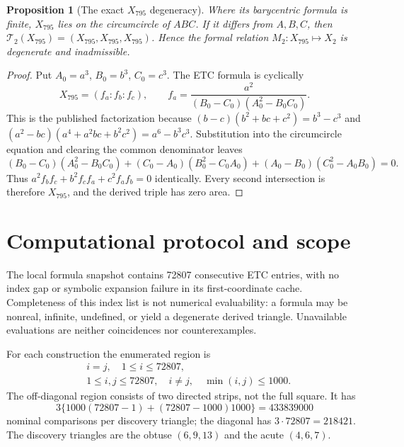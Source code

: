 \documentclass[11pt]{article}
\newtheorem{proposition}[theorem]{Proposition}
\newcommand{\Circ}{\mathcal T_2}
\begin{document}
\begin{proposition}[The exact $X_{795}$ degeneracy]\label{prop:x795}
Where its barycentric formula is finite, $X_{795}$ lies on the circumcircle
of $ABC$.  If it differs from $A,B,C$, then
$\Circ(X_{795})=(X_{795},X_{795},X_{795})$.  Hence the formal relation
$M_2:X_{795}\mapsto X_2$ is degenerate and inadmissible.
\end{proposition}
\begin{proof}
Put $A_0=a^3$, $B_0=b^3$, $C_0=c^3$.  The ETC formula is cyclically
\[
 X_{795}=(f_a:f_b:f_c),\qquad
 f_a=\frac{a^2}{(B_0-C_0)(A_0^2-B_0C_0)}.
\]
This is the published factorization because
$(b-c)(b^2+bc+c^2)=b^3-c^3$ and
$(a^2-bc)(a^4+a^2bc+b^2c^2)=a^6-b^3c^3$.
Substitution into the circumcircle equation and clearing the common
denominator leaves
\[
 (B_0-C_0)(A_0^2-B_0C_0)
 +(C_0-A_0)(B_0^2-C_0A_0)
 +(A_0-B_0)(C_0^2-A_0B_0)=0.
\]
Thus $a^2f_bf_c+b^2f_cf_a+c^2f_af_b=0$ identically.  Every second
intersection is therefore $X_{795}$, and the derived triple has zero area.
\end{proof}

\section{Computational protocol and scope}

The local formula snapshot contains 72807 consecutive ETC entries, with
no index gap or symbolic expansion failure in its first-coordinate cache.
Completeness of this index list is not numerical evaluability: a formula
may be nonreal, infinite, undefined, or yield a degenerate derived triangle.
Unavailable evaluations are neither coincidences nor counterexamples.

For each construction the enumerated region is
\begin{equation}\label{eq:scope}
 \begin{split}
 &i=j,\quad 1\leq i\leq72807,\\
 &1\leq i,j\leq72807,\quad i\ne j,\quad \min(i,j)\leq1000.
 \end{split}
\end{equation}
The off-diagonal region consists of two directed strips, not the full
square.  It has
\[
 3\{1000(72807-1)+(72807-1000)1000\}=433839000
\]
nominal comparisons per discovery triangle; the diagonal has
$3\cdot72807=218421$.  The discovery triangles are the obtuse
$(6,9,13)$ and the acute $(4,6,7)$.
\end{document}
